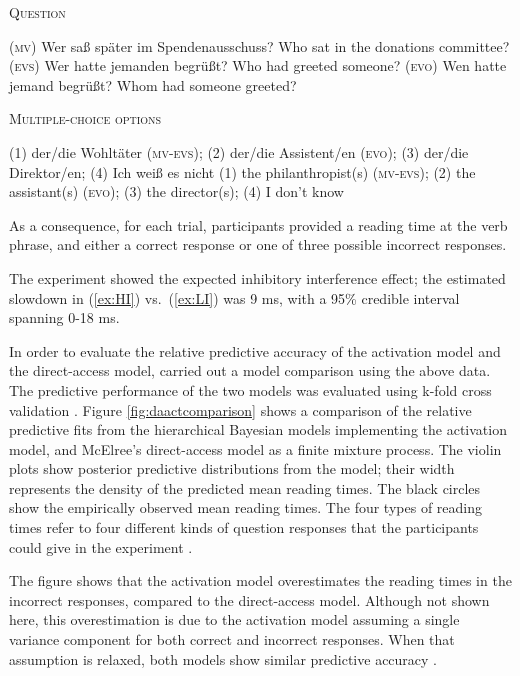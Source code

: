 \documentclass{cambridge7A}\usepackage[]{graphicx}\usepackage[]{color}
\begin{document}
\begin{exe}
    \ex  \textsc{Question} \label{ex:multip-q}
    \begin{xlist}
        \ex \textsc{(mv)} Wer saß später im Spendenausschuss? 
        \glt Who sat in the donations committee? 
        \ex \textsc{(evs)}  Wer hatte jemanden begrüßt? 
        \glt Who had greeted someone?
        \ex \textsc{(evo)}  Wen hatte jemand begrüßt? 
        \glt Whom had someone greeted?
    \end{xlist}

    \ex  \textsc{Multiple-choice options} \label{ex:answers}
    \begin{xlist}
        \ex (1) der/die Wohltäter \textsc{(mv-evs)}; (2) der/die Assistent/en \textsc{(evo)};
        (3) der/die Direktor/en; (4) Ich weiß es nicht
        \glt (1) the philanthropist(s) \textsc{(mv-evs)}; (2) the assistant(s) \textsc{(evo)}; (3)
        the director(s); (4) I don't know
    \end{xlist}
\end{exe}

As a consequence, for each trial, participants provided a reading time at the verb phrase, and either a correct response or one of three possible incorrect responses. 

The experiment showed the expected inhibitory interference effect; the estimated slowdown in (\ref{ex:HI}) vs.\ (\ref{ex:LI}) was 9 ms, with a 95\% credible interval spanning 0-18 ms.  

In order to evaluate the relative predictive accuracy of the activation model and the direct-access model, \cite{NicenboimRetrieval2018} carried out a model comparison using the above data. The predictive performance of the two models was evaluated using k-fold cross validation \citep{vehtari2012survey,vehtari2016LOOwaic}. 
Figure \ref{fig:daactcomparison} shows a comparison of the relative predictive fits from the hierarchical Bayesian models implementing the activation model, and McElree's direct-access model as a finite mixture process. The violin plots show posterior predictive distributions from the model; their width represents the density of the predicted mean reading times. The black circles show the empirically observed mean reading times. The four types of reading times refer to four different kinds of question responses that the participants could give in the experiment \citep{nicenboimexploratory}. 

The figure shows that the activation model overestimates the reading times in the incorrect responses, compared to the direct-access model. Although not shown here, this overestimation is due to the activation model assuming a single variance component for both correct and incorrect responses. When that assumption is relaxed, both models show similar predictive accuracy \citep{NicenboimRetrieval2018}.
\end{document}
